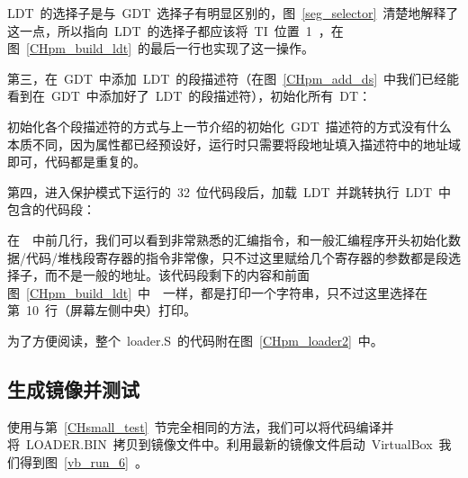 LDT~的选择子是与~GDT~选择子有明显区别的，图~\ref{seg_selector}~清楚地解释了这一点，所以指向~LDT~的选择子都应该将~TI~位置~1~，在图~\ref{CHpm_build_ldt}~的最后一行也实现了这一操作。

第三，在~GDT~中添加~LDT~的段描述符（在图~\ref{CHpm_add_ds}~中我们已经能看到在~GDT~中添加好了~LDT~的段描述符），初始化所有~DT：

\label{CHpm_init_dts}

初始化各个段描述符的方式与上一节介绍的初始化~GDT~描述符的方式没有什么本质不同，因为属性都已经预设好，运行时只需要将段地址填入描述符中的地址域即可，代码都是重复的。

第四，进入保护模式下运行的~32~位代码段后，加载~LDT~并跳转执行~LDT~中包含的代码段：

\label{CHpm_run_ldt}

在~~中前几行，我们可以看到非常熟悉的汇编指令，和一般汇编程序开头初始化数据/代码/堆栈段寄存器的指令非常像，只不过这里赋给几个寄存器的参数都是段选择子，而不是一般的地址。该代码段剩下的内容和前面图~\ref{CHpm_build_ldt}~中~~一样，都是打印一个字符串，只不过这里选择在第~10~行（屏幕左侧中央）打印。

为了方便阅读，整个~loader.S~的代码附在图~\ref{CHpm_loader2}~中。

\label{CHpm_loader2}

\subsection{生成镜像并测试}

使用与第~\ref{CHsmall_test}~节完全相同的方法，我们可以将代码编译并将~LOADER.BIN~拷贝到镜像文件中。利用最新的镜像文件启动~VirtualBox~我们得到图~\ref{vb_run_6}~。


